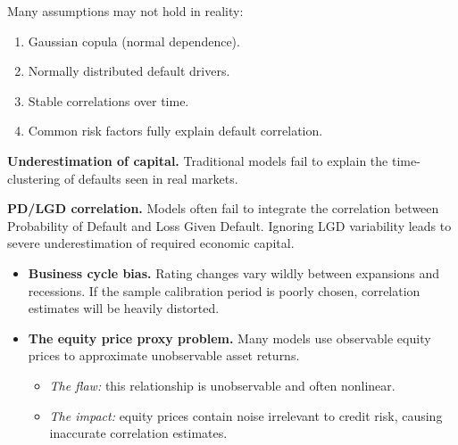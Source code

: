 
Many assumptions may not hold in reality:

\begin{enumerate}
\item[\textcolor{rust}{\sffamily\bfseries 1)}] Gaussian copula (normal
dependence).
\item[\textcolor{rust}{\sffamily\bfseries 2)}] Normally distributed default
drivers.
\item[\textcolor{rust}{\sffamily\bfseries 3)}] Stable correlations over time.
\item[\textcolor{rust}{\sffamily\bfseries 4)}] Common risk factors fully explain
default correlation.
\end{enumerate}


\begin{lettered}
\item \textbf{Underestimation of capital.} Traditional models fail to explain the
time-clustering of defaults seen in real markets.
\item \textbf{PD/LGD correlation.} Models often fail to integrate the correlation
between Probability of Default and Loss Given Default. Ignoring LGD variability
leads to severe underestimation of required economic capital.
\end{lettered}


\begin{itemize}
\item \textbf{Business cycle bias.} Rating changes vary wildly between expansions
and recessions. If the sample calibration period is poorly chosen, correlation
estimates will be heavily distorted.
\item \textbf{The equity price proxy problem.} Many models use observable equity
prices to approximate unobservable asset returns.
  \begin{itemize}
  \item \emph{The flaw:} this relationship is unobservable and often nonlinear.
  \item \emph{The impact:} equity prices contain noise irrelevant to credit risk,
  causing inaccurate correlation estimates.
  \end{itemize}
\end{itemize}


